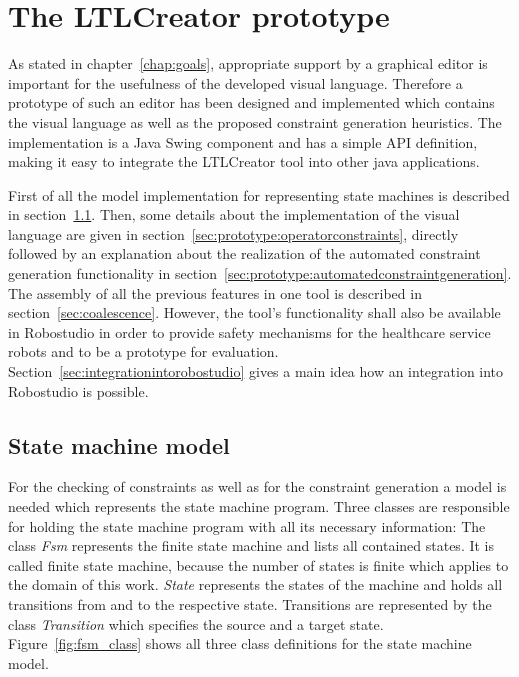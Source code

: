 \chapter{The LTLCreator prototype}
\label{chap:theltlcreatorprototype}

As stated in chapter~\ref{chap:goals}, appropriate support by a graphical editor is important for the usefulness of the developed visual language. Therefore a prototype of such an editor has been designed and implemented which contains the visual language as well as the proposed constraint generation heuristics. The implementation is a Java Swing component and has a simple API definition, making it easy to integrate the LTLCreator tool into other java applications.

First of all the model implementation for representing state machines is described in section~\ref{sec:statemachinemodel}. Then, some details about the implementation of the visual language are given in section~\ref{sec:prototype:operatorconstraints}, directly followed by an explanation about the realization of the automated constraint generation functionality in section~\ref{sec:prototype:automatedconstraintgeneration}.
The assembly of all the previous features in one tool is described in section~\ref{sec:coalescence}. However, the tool's functionality shall also be available in Robostudio in order to provide safety mechanisms for the healthcare service robots and to be a prototype for evaluation. Section~\ref{sec:integrationintorobostudio} gives a main idea how an integration into Robostudio is possible. 


\section{State machine model}
\label{sec:statemachinemodel}

For the checking of constraints as well as for the constraint generation a model is needed which represents the state machine program. Three classes are responsible for holding the state machine program with all its necessary information: The class \emph{Fsm} represents the finite state machine and lists all contained states. It is called finite state machine, because the number of states is finite which applies to the domain of this work. \emph{State} represents the states of the machine and holds all transitions from and to the respective state. Transitions are represented by the class \emph{Transition} which specifies the source and a target state. Figure~\ref{fig:fsm_class} shows all three class definitions for the state machine model.

